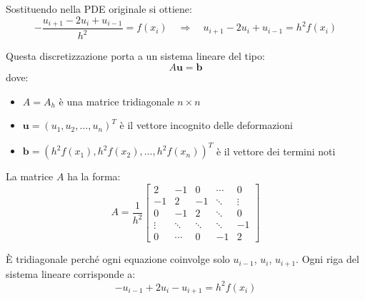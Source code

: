 \documentclass[12pt,a4paper]{article}
\begin{document}
Sostituendo nella PDE originale si ottiene:
\[
- \frac{u_{i+1} - 2u_i + u_{i-1}}{h^2} = f(x_i)
\quad \Rightarrow \quad
u_{i+1} - 2u_i + u_{i-1} = h^2 f(x_i)
\]

Questa discretizzazione porta a un sistema lineare del tipo:
\[
A \mathbf{u} = \mathbf{b}
\]
dove:
\begin{itemize}
  \item $A = A_h$ è una matrice tridiagonale $n \times n$
  \item $\mathbf{u} = (u_1, u_2, \dots, u_n)^T$ è il vettore incognito delle deformazioni
  \item $\mathbf{b} = (h^2 f(x_1), h^2 f(x_2), \dots, h^2 f(x_n))^T$ è il vettore dei termini noti
\end{itemize}

La matrice $A$ ha la forma:
\[
A = \frac{1}{h^2}
\begin{bmatrix}
2 & -1 & 0 & \cdots & 0 \\
-1 & 2 & -1 & \ddots & \vdots \\
0 & -1 & 2 & \ddots & 0 \\
\vdots & \ddots & \ddots & \ddots & -1 \\
0 & \cdots & 0 & -1 & 2
\end{bmatrix}
\]

È tridiagonale perché ogni equazione coinvolge solo $u_{i-1}$, $u_i$, $u_{i+1}$. Ogni riga del sistema lineare corrisponde a:
\[
- u_{i-1} + 2u_i - u_{i+1} = h^2 f(x_i)
\]
\end{document}
